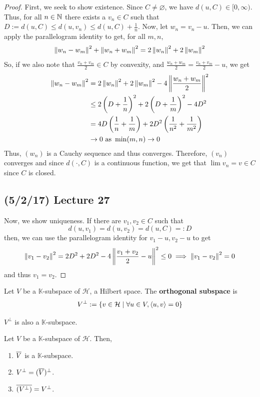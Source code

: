 \documentclass[11pt,leqno,oneside]{amsbook}
\numberwithin{thm}{section}
\newcommand{\K}{\mathbb{K}} %
\renewcommand{\emptyset}{\varnothing}
\renewcommand{\H}{\mathcal{H}} %
\renewcommand{\de}{\textbf} %
\begin{document}
\begin{proof}
  First, we seek to show existence. Since \(C \neq \emptyset\), we
  have \(d(u,C) \in [0,\infty)\). Thus,
  for all \(n \in \N\)
  there exists a \(v_n \in C\) such that \(D := d(u,C) \leq d(u,v_n) \leq
  d(u,C) +\frac{1}{n}\). Now, let \(w_n = v_n - u\). Then, we can
  apply the parallelogram identity to get, for all \(m,n\), \[
    \norm[w_n-w_m]^2 + \norm[w_n+w_m]^2 = 2 \norm[w_n]^2 + 2 \norm[w_m]^2
  \]
  So, if we also note that \(\frac{v_n+v_m}{2} \in C\) by convexity,
  and \(\frac{w_n+w_m}{2} = \frac{v_n+v_m}{2}-u\), we get
  \begin{align*}
    \norm[w_n-w_m]^2 & = 2 \norm[w_n]^2 + 2 \norm[w_m]^2 - 4
                       \norm[\frac{w_n + w_m}{2}]^2 \\
    & \leq 2 \left( D + \frac{1}{n} \right)^2 + 2\left( D +
      \frac{1}{m} \right)^2 - 4D^2 \\
    & = 4D \left( \frac{1}{n} + \frac{1}{m} \right) + 2 D^2 \left(
      \frac{1}{n^2} + \frac{1}{m^2} \right) \\
    & \to 0 \text{ as } \min(m,n) \to 0
  \end{align*}
  Thus, \((w_n)\) is a Cauchy sequence and thus converges. Therefore,
  \((v_n)\) converges and since \(d(\cdot, C)\) is a continuous
  function, we get that \(\lim v_n = v \in C\) since \(C\) is closed.

  \subsection*{(5/2/17) Lecture 27}
  Now, we show uniqueness. If there are \(v_1, v_2 \in C\) such
  that \[
    d(u,v_1) = d(u,v_2) = d(u,C) =: D
  \]
  then, we can use the parallelogram identity for \(v_1-u,v_2-u\) to
  get \[
    \norm[v_1-v_2]^2 = 2D^2 + 2D^2 - 4 \norm[\frac{v_1+v_2}{2} - u]^2
    \leq 0 \implies \norm[v_1-v_2]^2 = 0
  \]
  and thus \(v_1 = v_2\).
\end{proof}
\begin{defn}
  Let \(V\) be a \(\K\)-subspace of \(\H\), a Hilbert space. The \de{orthogonal subspace}
  is \[
    V^\perp := \left\{ v \in \H \st \forall u \in V, \langle u,v
      \rangle = 0 \right\}
  \]
\end{defn}
\begin{rmk}
  \(V^\perp\) is also a \(\K\)-subspace.
\end{rmk}
\begin{prop}
  Let \(V\) be a \(\K\)-subspace of \(\H\). Then,
  \begin{enumerate}
  \item \(\ov{V}\) is a \(\K\)-subspace.
  \item \(V^\perp = (\ov{V})^\perp\).
  \item \(\ov{(V^\perp)} = V^\perp\).
  \end{enumerate}
\end{prop}
\end{document}
